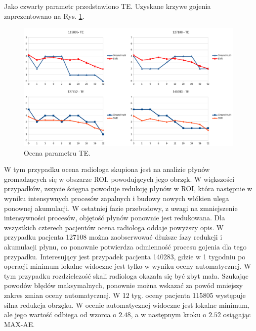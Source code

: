 Jako czwarty parametr przedstawiono TE. Uzyskane krzywe gojenia zaprezentowano na Rys. \ref{fig:TE}.
\begin{figure}[h!]
	\centering
	\includegraphics[width=1\textwidth]{figures/TE.png}
	\caption{Ocena parametru TE.}\label{fig:TE}
\end{figure}
W tym przypadku ocena radiologa skupiona jest na analizie płynów gromadzących się w obszarze ROI, powodujących jego obrzęk. W większości przypadków, zszycie ścięgna powoduje redukcję płynów w ROI, która następnie w wyniku intensywnych procesów zapalnych i budowy nowych włókien ulega ponownej akumulacji. W ostatniej fazie przebudowy, z uwagi na zmniejszenie intensywności procesów, objętość płynów ponownie jest redukowana. Dla wszystkich czterech pacjentów ocena radiologa oddaje powyższy opis. W przypadku pacjenta 127108 można zaobserwować dłuższe fazy redukcji i akumulacji płynu, co ponownie potwierdza odmienność procesu gojenia dla tego przypadku. Interesujący jest przypadek pacjenta 140283, gdzie w 1 tygodniu po operacji minimum lokalne widoczne jest tylko w wyniku oceny automatycznej. W tym przypadku rozdzielczość skali radiologa okazała się być zbyt mała. Szukając powodów błędów maksymalnych, ponownie można wskazać za powód mniejszy zakres zmian oceny automatycznej. W 12 tyg. oceny pacjenta 115805 występuje silna redukcja obrzęku. W ocenie automatycznej widoczne jest lokalne minimum, ale jego wartość odbiega od wzorca o $2.48$, a w następnym kroku o $2.52$ osiągając MAX-AE. 

